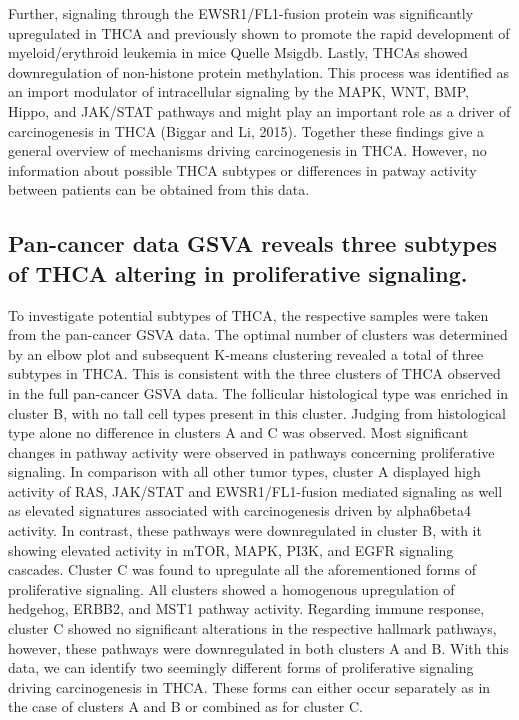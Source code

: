 \documentclass[
  parskip,
  oneside]{scrreprt}
\begin{document}
Further, signaling through the EWSR1/FL1-fusion protein was
significantly upregulated in THCA and previously shown to promote the
rapid development of myeloid/erythroid leukemia in mice Quelle Msigdb.
Lastly, THCAs showed downregulation of non-histone protein methylation.
This process was identified as an import modulator of intracellular
signaling by the MAPK, WNT, BMP, Hippo, and JAK/STAT pathways and might
play an important role as a driver of carcinogenesis in THCA (Biggar and
Li, 2015). Together these findings give a general overview of mechanisms
driving carcinogenesis in THCA. However, no information about possible
THCA subtypes or differences in patway activity between patients can be
obtained from this data.

\hypertarget{pan-cancer-data-gsva-reveals-three-subtypes-of-thca-altering-in-proliferative-signaling.}{%
\subsection{Pan-cancer data GSVA reveals three subtypes of THCA altering
in proliferative
signaling.}\label{pan-cancer-data-gsva-reveals-three-subtypes-of-thca-altering-in-proliferative-signaling.}}

To investigate potential subtypes of THCA, the respective samples were
taken from the pan-cancer GSVA data. The optimal number of clusters was
determined by an elbow plot and subsequent K-means clustering revealed a
total of three subtypes in THCA. This is consistent with the three
clusters of THCA observed in the full pan-cancer GSVA data. The
follicular histological type was enriched in cluster B, with no tall
cell types present in this cluster. Judging from histological type alone
no difference in clusters A and C was observed. Most significant changes
in pathway activity were observed in pathways concerning proliferative
signaling. In comparison with all other tumor types, cluster A displayed
high activity of RAS, JAK/STAT and EWSR1/FL1-fusion mediated signaling
as well as elevated signatures associated with carcinogenesis driven by
alpha6beta4 activity. In contrast, these pathways were downregulated in
cluster B, with it showing elevated activity in mTOR, MAPK, PI3K, and
EGFR signaling cascades. Cluster C was found to upregulate all the
aforementioned forms of proliferative signaling. All clusters showed a
homogenous upregulation of hedgehog, ERBB2, and MST1 pathway activity.
Regarding immune response, cluster C showed no significant alterations
in the respective hallmark pathways, however, these pathways were
downregulated in both clusters A and B. With this data, we can identify
two seemingly different forms of proliferative signaling driving
carcinogenesis in THCA. These forms can either occur separately as in
the case of clusters A and B or combined as for cluster C.
\end{document}
